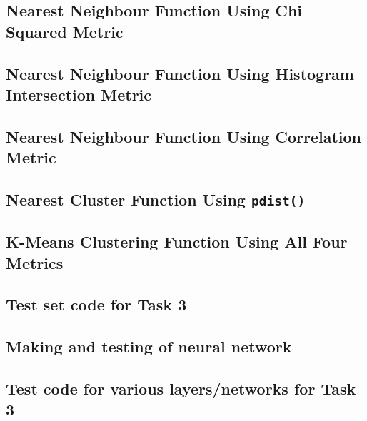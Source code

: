 \documentclass[a4paper, 10pt, conference]{ieeeconf}
\begin{document}
\subsection*{Nearest Neighbour Function Using Chi Squared Metric}


\subsection*{Nearest Neighbour Function Using Histogram Intersection Metric}

\newpage

\subsection*{Nearest Neighbour Function Using Correlation Metric}


\subsection*{Nearest Cluster Function Using \texttt{pdist()}}

\newpage

\subsection*{K-Means Clustering Function Using All Four Metrics}

\newpage

\subsection*{Test set code for Task 3}

\newpage

\subsection*{Making and testing of neural network}

\newpage

\subsection*{Test code for various layers/networks for Task 3}

\newpage
\end{document}
